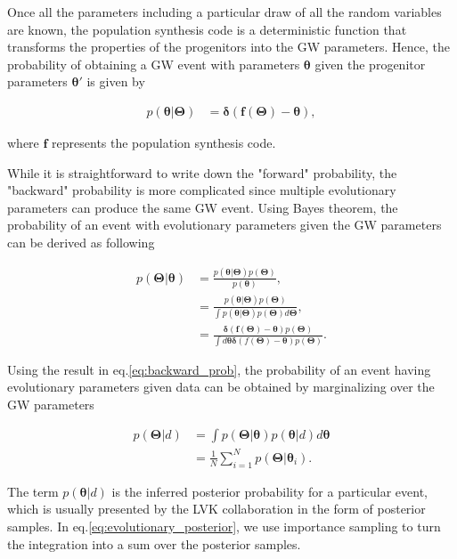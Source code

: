\documentclass[twocolumn]{aastex631}
\begin{document}
Once all the parameters including a particular draw of all the random variables are known,
the population synthesis code is a deterministic function that transforms the properties of the progenitors into the GW parameters.
Hence, the probability of obtaining a GW event with parameters $\bm{\theta}$ given the progenitor parameters $\bm{\theta}'$ is given by

\begin{align}
    p(\bm{\theta}|\bm{\Theta}) &= \bm{\delta}(\bm{f}(\bm{\Theta})-\bm{\theta}),
\end{align}

where $\bm{f}$ represents the population synthesis code.

While it is straightforward to write down the "forward" probability, the "backward" probability is more complicated since multiple evolutionary parameters can produce the same GW event.
Using Bayes theorem, the probability of an event with evolutionary parameters given the GW parameters can be derived as following

\begin{align}
    p(\bm{\Theta}|\bm{\theta}) &= \frac{p(\bm{\theta}|\bm{\Theta})p(\bm{\Theta})}{p(\bm{\theta})}, \nonumber \\
    &= \frac{p(\bm{\theta}|\bm{\Theta})p(\bm{\Theta})}{\int p(\bm{\theta}|\bm{\Theta}) p(\bm{\Theta}) d\bm{\Theta}}, \nonumber \\
    &= \frac{\bm{\delta}(\bm{f}(\bm{\Theta})-\bm{\theta})p(\bm{\Theta})}{\int d\bm{\theta} \bm{\delta}(f(\bm{\Theta})-\bm{\theta})p(\bm{\Theta})}.
\label{eq:backward_prob}
\end{align}

Using the result in eq.\ref{eq:backward_prob},
the probability of an event having evolutionary parameters given data can be obtained by marginalizing over the GW parameters

\begin{align}
    p(\bm{\Theta}|d) &= \int p(\bm{\Theta}|\bm{\theta}) p(\bm{\theta}|d) d\bm{\theta}\\
    &= \frac{1}{N}\sum_{i=1}^{N} p(\bm{\Theta}|\bm{\theta}_i). \label{eq:evolutionary_posterior}
\end{align}

The term $p(\bm{\theta}|d)$ is the inferred posterior probability for a particular event, which is usually presented by the LVK collaboration in the form of posterior samples.
In eq.\ref{eq:evolutionary_posterior}, we use importance sampling to turn the integration into a sum over the posterior samples.
\end{document}
